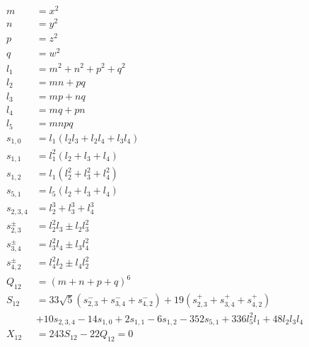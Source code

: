 \documentclass{article}
\begin{document}
\begin{align*}
  m &= x^2 \\
  n &= y^2 \\
  p &= z^2 \\
  q &= w^2 \\
  l_1 &= m^2+n^2+p^2+q^2 \\
  l_2 &= mn+pq \\
  l_3 &= mp+nq \\
  l_4 &= mq+pn \\
  l_5 &= mnpq \\
  s_{1,0} &= l_1(l_2l_3+l_2l_4+l_3l_4) \\
  s_{1,1} &= l_1^2(l_2+l_3+l_4) \\
  s_{1,2} &= l_1(l_2^2+l_3^2+l_4^2) \\
  s_{5,1} &= l_5(l_2+l_3+l_4) \\
  s_{2,3,4} &= l_2^3+l_3^3+l_4^3 \\
  s_{2,3}^{\pm} &= l_2^2l_3 \pm l_2l_3^2 \\
  s_{3,4}^{\pm} &= l_3^2l_4 \pm l_3l_4^2 \\
  s_{4,2}^{\pm} &= l_4^2l_2 \pm l_4l_2^2 \\
  Q_{12} &= (m+n+p+q)^6 \\
  S_{12} &= 33\sqrt{5}(s_{2,3}^{-}+s_{3,4}^{-}+s_{4,2}^{-})+19(s_{2,3}^{+}+s_{3,4}^{+}+s_{4,2}^{+}) \\
  &+ 10s_{2,3,4}-14s_{1,0}+2s_{1,1}-6s_{1,2}-352s_{5,1}+336l_5^2l_1+48l_2l_3l_4 \\
  X_{12} &= 243S_{12}-22Q_{12}=0
\end{align*}
\end{document}
